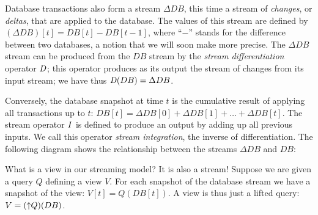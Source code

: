 Database transactions also form a stream $\Delta DB$, this time a
stream of \emph{changes}, or \emph{deltas}, that are applied to the
database.  The values of this stream are defined by $(\Delta DB)[t] =
DB[t] - DB[t-1]$, where ``$-$'' stands for the difference between two
databases, a notion that we will soon make more precise.  The $\Delta
DB$ stream can be produced from the $DB$ stream by the \emph{stream
differentiation} operator $\mathit{D}$; this operator produces as its output
the stream of changes from its input stream; we have thus $\mathit{D}(DB) =
\Delta DB$.

Conversely, the database snapshot at time $t$ is the cumulative result
of applying all transactions up to $t$: $DB[t] = \Delta DB[0] + \Delta
DB[1] + \ldots + \Delta DB[t]$.  The stream operator $\mathit{I}$ is defined
to produce an output by adding up all previous inputs.  We call this
operator \emph{stream integration}, the inverse of differentiation.
The following diagram shows the relationship between the streams
$\Delta DB$ and $DB$:
\begin{center}
\end{center}

What is a view in our streaming model?  It is also a stream!  Suppose
we are given a query $Q$ defining a view $V$.  For each snapshot of
the database stream we have a snapshot of the view: $V[t] = Q(DB[t])$.
A view is thus just a lifted query: $V = ({\uparrow}Q)(DB)$.

